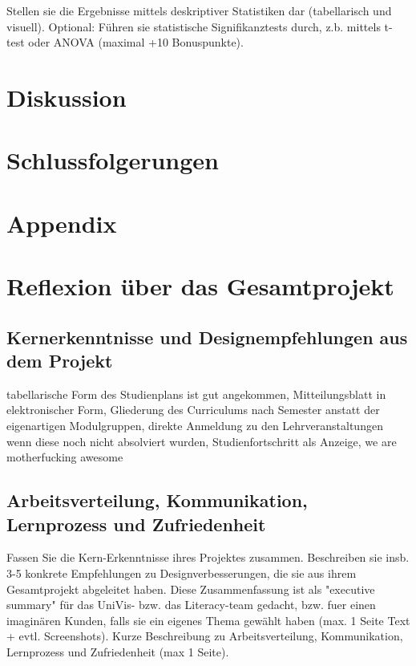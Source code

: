 \documentclass[a4paper,10pt]{scrartcl}
\begin{document}
Stellen sie die Ergebnisse mittels deskriptiver Statistiken dar (tabellarisch und visuell). 
Optional: Führen sie statistische Signifikanztests durch, z.b. mittels t-test oder ANOVA (maximal +10 Bonuspunkte). 

\section{Diskussion}


\section{Schlussfolgerungen}


\section{Appendix}

\section{Reflexion über das Gesamtprojekt}

\subsection{Kernerkenntnisse und Designempfehlungen aus dem Projekt}

tabellarische Form des Studienplans ist gut angekommen, Mitteilungsblatt in elektronischer Form, Gliederung des Curriculums nach Semester anstatt der eigenartigen
Modulgruppen, direkte Anmeldung zu den Lehrveranstaltungen wenn diese noch nicht absolviert wurden, Studienfortschritt als Anzeige, we are motherfucking awesome

\subsection{Arbeitsverteilung, Kommunikation, Lernprozess und Zufriedenheit}


    Fassen Sie die Kern-Erkenntnisse ihres Projektes zusammen. Beschreiben sie insb. 3-5 konkrete Empfehlungen zu Designverbesserungen, 
    die sie aus ihrem Gesamtprojekt abgeleitet haben. Diese Zusammenfassung ist als "executive summary" für das UniVis- bzw. das Literacy-team gedacht, 
    bzw. fuer einen imaginären Kunden, falls sie ein eigenes Thema gewählt haben (max. 1 Seite Text + evtl. Screenshots).
    Kurze Beschreibung zu Arbeitsverteilung, Kommunikation, Lernprozess und Zufriedenheit (max 1 Seite). 
\end{document}
